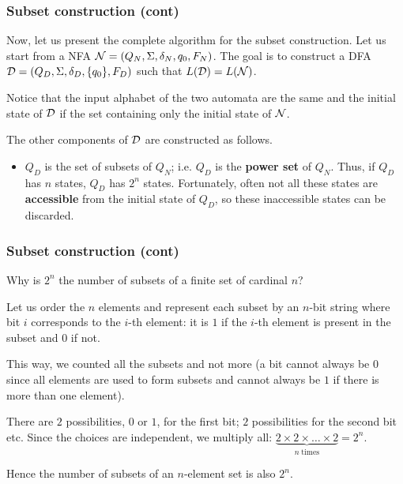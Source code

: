 % 
\begin{frame}
\frametitle{Subset construction (cont)}

Now, let us present the complete algorithm for the subset
construction. Let us start from a NFA \({\cal N} = (Q_N, \Sigma,
\delta_N, q_0, F_N)\). The goal is to construct a DFA \({\cal D} =
(Q_D, \Sigma, \delta_D, \{q_0\}, F_D)\) such that \(L({\cal D}) =
L({\cal N})\).

\bigskip

Notice that the input alphabet of the two automata are the same and
the initial state of \({\cal D}\) if the set containing only the
initial state of \({\cal N}\).

\bigskip

The other components of \({\cal D}\) are constructed as follows.
\begin{itemize}

  \item \(Q_D\) is the set of subsets of \(Q_N\); i.e. \(Q_D\) is the
  \textbf{power set} of \(Q_N\). Thus, if \(Q_D\) has \(n\) states,
  \(Q_D\) has \(2^n\) states. Fortunately, often not all these states
  are \textbf{accessible} from the initial state of \(Q_D\), so these
  inaccessible states can be discarded.

\end{itemize}

\end{frame}

% 
\begin{frame}
\frametitle{Subset construction (cont)}

\label{state_explosion}

Why is \(2^n\) the number of subsets of a finite set of cardinal
\(n\)?

\bigskip

Let us order the \(n\) elements and represent each subset by an
\(n\)-bit string where bit \(i\) corresponds to the \(i\)-th element:
it is \(1\) if the \(i\)-th element is present in the subset and \(0\)
if not.

\bigskip

This way, we counted all the subsets and not more (a bit cannot always
be \(0\) since all elements are used to form subsets and cannot always
be \(1\) if there is more than one element).

There are \(2\) possibilities, \(0\) or \(1\), for the first bit;
\(2\) possibilities for the second bit etc. Since the choices are
independent, we multiply all: \(\underbrace{2 \times 2 \times
  \dots \times 2}_{n \; \text{times}} = 2^n\).

\bigskip

Hence the number of subsets of an \(n\)-element set is also \(2^n\).

\end{frame}

